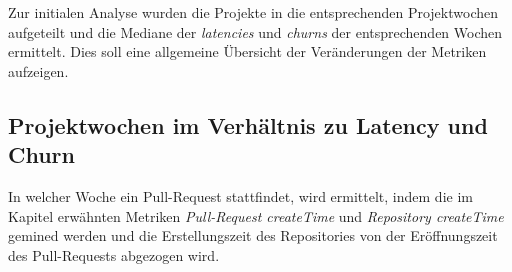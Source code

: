 Zur initialen Analyse wurden die Projekte in die entsprechenden Projektwochen aufgeteilt und die Mediane der \textit{latencies} und \textit{churns} der entsprechenden Wochen ermittelt. Dies soll eine allgemeine Übersicht der Veränderungen der Metriken aufzeigen.

\subsection{Projektwochen im Verhältnis zu Latency und Churn}
\label{sec:ProjektwochenLatencyChurn}
In welcher Woche ein Pull-Request stattfindet, wird ermittelt, indem die im Kapitel  erwähnten Metriken \textit{Pull-Request createTime} und \textit{Repository createTime} gemined werden und die Erstellungszeit des Repositories von der Eröffnungszeit des Pull-Requests abgezogen wird. 


